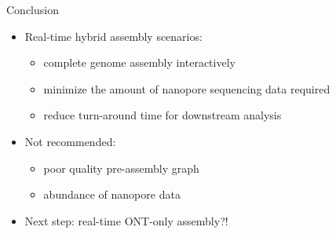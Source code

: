 \documentclass{beamer}
\begin{document}
\begin{frame}{Conclusion}
\begin{itemize}
\item Real-time hybrid assembly scenarios:
	\begin{itemize}
		\item complete genome assembly interactively
		\item minimize the amount of nanopore sequencing data required
		\item reduce turn-around time for downstream analysis 
	\end{itemize}
\item Not recommended:
	\begin{itemize}
		\item poor quality pre-assembly graph
		\item abundance of nanopore data 
	\end{itemize}
\item Next step: real-time ONT-only assembly?!
\end{itemize}
\end{frame}
{
\begin{frame}[plain]
\end{frame}
}
\end{document}
